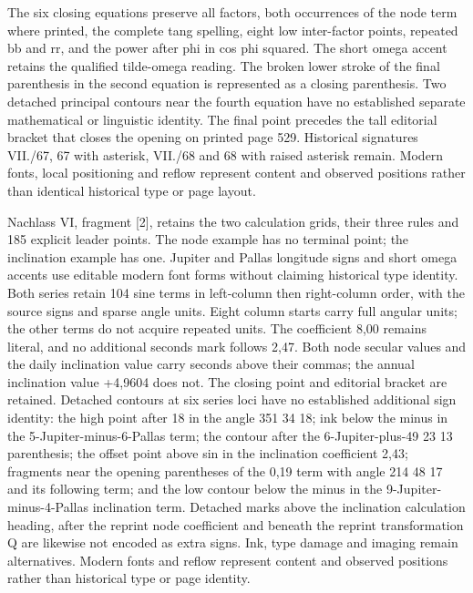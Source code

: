 The six closing equations preserve all factors, both occurrences of the node term where printed, the complete tang spelling, eight low inter-factor points, repeated bb and rr, and the power after phi in cos phi squared. The short omega accent retains the qualified tilde-omega reading. The broken lower stroke of the final parenthesis in the second equation is represented as a closing parenthesis. Two detached principal contours near the fourth equation have no established separate mathematical or linguistic identity. The final point precedes the tall editorial bracket that closes the opening on printed page 529. Historical signatures VII./67, 67 with asterisk, VII./68 and 68 with raised asterisk remain. Modern fonts, local positioning and reflow represent content and observed positions rather than identical historical type or page layout.

Nachlass VI, fragment [2], retains the two calculation grids, their three rules and 185 explicit leader points. The node example has no terminal point; the inclination example has one. Jupiter and Pallas longitude signs and short omega accents use editable modern font forms without claiming historical type identity. Both series retain 104 sine terms in left-column then right-column order, with the source signs and sparse angle units. Eight column starts carry full angular units; the other terms do not acquire repeated units. The coefficient 8,00 remains literal, and no additional seconds mark follows 2,47. Both node secular values and the daily inclination value carry seconds above their commas; the annual inclination value +4,9604 does not. The closing point and editorial bracket are retained. Detached contours at six series loci have no established additional sign identity: the high point after 18 in the angle 351 34 18; ink below the minus in the 5-Jupiter-minus-6-Pallas term; the contour after the 6-Jupiter-plus-49 23 13 parenthesis; the offset point above sin in the inclination coefficient 2,43; fragments near the opening parentheses of the 0,19 term with angle 214 48 17 and its following term; and the low contour below the minus in the 9-Jupiter-minus-4-Pallas inclination term. Detached marks above the inclination calculation heading, after the reprint node coefficient and beneath the reprint transformation Q are likewise not encoded as extra signs. Ink, type damage and imaging remain alternatives. Modern fonts and reflow represent content and observed positions rather than historical type or page identity.

